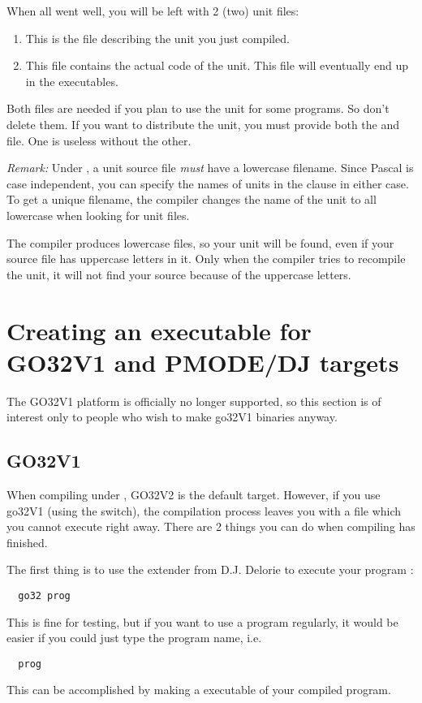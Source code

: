 \documentclass{report}
\begin{document}
When all went well, you will be left with 2 (two) unit files:
\begin{enumerate}
\item {} This is the file describing the unit you just
compiled.
\item {} This file contains the actual code of the unit.
This file will eventually end up in the executables.
\end{enumerate}
Both files are needed if you plan to use the unit for some programs. 
So don't delete them. If you want to distribute the unit, you must
provide both the  and  file. One is useless without the
other.

{\em Remark:}
Under \linux, a unit source file {\em must} have a lowercase filename.
Since Pascal is case independent, you can specify the names of units in the
 clause in either case. To get a unique filename, the \fpc compiler
changes the name of the unit to all lowercase when looking for unit files.

The compiler produces lowercase files, so your unit will be found, even if
your source file has uppercase letters in it. Only when the compiler tries to
recompile the unit, it will not find your source because of the uppercase
letters. 

\section{Creating an executable for GO32V1 and PMODE/DJ targets}
\label{go32v1}

The GO32V1 platform is officially no longer supported, so this section
is of interest only to people who wish to make go32V1 binaries anyway. 

%
%
\subsection{GO32V1}
When compiling under \dos, GO32V2 is the default target. However, if you use
go32V1 (using the  switch), the 
compilation process leaves you with a file which you cannot execute right away.
There are 2 things you can do when compiling has finished.

The first thing is to use the \dos extender from D.J. Delorie to execute
your program :
\begin{verbatim}
  go32 prog
\end{verbatim}
This is fine for testing, but if you want to use a program regularly, it
would be easier if you could just type the program name, i.e.
\begin{verbatim}
  prog
\end{verbatim}
This can be accomplished by making a \dos executable of your compiled program.
 
\end{document}
